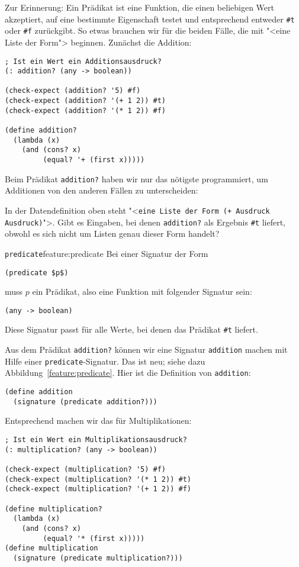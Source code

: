 Zur Erinnerung: Ein Prädikat ist eine Funktion, die
einen beliebigen Wert akzeptiert, auf eine bestimmte Eigenschaft
testet und entsprechend entweder \lstinline{#t} oder \lstinline{#f}
zurückgibt.  So etwas brauchen wir für die beiden Fälle, die mit
"<eine Liste der Form"> beginnen.  Zunächst die Addition:
%
\begin{lstlisting}
; Ist ein Wert ein Additionsausdruck?
(: addition? (any -> boolean))

(check-expect (addition? '5) #f)
(check-expect (addition? '(+ 1 2)) #t)
(check-expect (addition? '(* 1 2)) #f)

(define addition?
  (lambda (x)
    (and (cons? x)
         (equal? '+ (first x)))))
\end{lstlisting}
%
Beim Prädikat \lstinline{addition?} haben wir nur das nötigste
programmiert, um Additionen von den anderen Fällen zu unterscheiden:
\begin{aufgabeinline}
  In der Datendefinition oben steht "<\texttt{eine Liste der Form (+
    Ausdruck Ausdruck)}">.  Gibt es Eingaben, bei denen
  \lstinline{addition?} als Ergebnis \lstinline{#t} liefert, obwohl es
  sich nicht um Listen genau dieser Form handelt?
\end{aufgabeinline}
%
\begin{feature}{\texttt{predicate}}{feature:predicate}
  Bei einer Signatur der Form
\begin{lstlisting}
(predicate $p$)
\end{lstlisting}
  muss $p$ ein Prädikat, also eine Funktion mit folgender Signatur sein:
\begin{lstlisting}
(any -> boolean)
\end{lstlisting}
  Diese Signatur passt für alle Werte, bei denen das Prädikat
  \lstinline{#t} liefert.
\end{feature}
%
Aus dem Prädikat \lstinline{addition?} können wir eine Signatur
\lstinline{addition} machen mit Hilfe einer
\lstinline{predicate}-Signatur.  Das ist neu; siehe dazu
Abbildung~\ref{feature:predicate}.  Hier ist die Definition von
\lstinline{addition}:
%
\begin{lstlisting}
(define addition
  (signature (predicate addition?)))
\end{lstlisting}
%
Entsprechend machen wir das für Multiplikationen:
%
\begin{lstlisting}
; Ist ein Wert ein Multiplikationsausdruck?
(: multiplication? (any -> boolean))

(check-expect (multiplication? '5) #f)
(check-expect (multiplication? '(* 1 2)) #t)
(check-expect (multiplication? '(+ 1 2)) #f)

(define multiplication?
  (lambda (x)
    (and (cons? x)
         (equal? '* (first x)))))
(define multiplication
  (signature (predicate multiplication?)))
\end{lstlisting}
